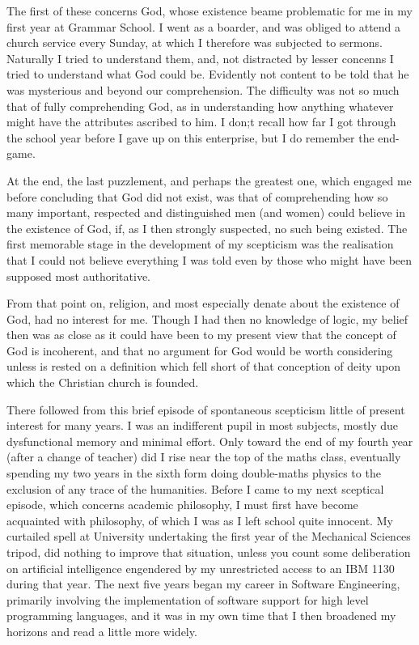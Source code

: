 \documentclass[10pt,titlepage]{book}
\begin{document}
The first of these concerns God, whose existence beame problematic for me in my first year at Grammar School.
I went as a boarder, and was obliged to attend a church service every Sunday, at which I therefore was subjected to sermons.
Naturally I tried to understand them, and, not distracted by lesser concenns I tried to understand what God could be.
Evidently not content to be told that he was mysterious and beyond our comprehension.
The difficulty was not so much that of fully comprehending God, as in understanding how anything whatever might have the attributes ascribed to him.
I don;t recall how far I got through the school year before I gave up on this enterprise, but I do remember the end-game.

At the end, the last puzzlement, and perhaps the greatest one, which engaged me before concluding that God did not exist, was that of comprehending how so many important, respected and distinguished men (and women) could believe in the existence of God, if, as I then strongly suspected, no such being existed.
The first memorable stage in the development of my scepticism was the realisation that I could not believe everything I was told even by those who might have been supposed most authoritative.

From that point on, religion, and most especially denate about the existence of God, had no interest for me.
Though I had then no knowledge of logic, my belief then was as close as it could have been to my present view that the concept of God is incoherent, and that no argument for God would be worth considering unless is rested on a definition which fell short of that conception of deity upon which the Christian church is founded.

There followed from this brief episode of spontaneous scepticism little of present interest for many years.
I was an indifferent pupil in most subjects, mostly due dysfunctional memory and minimal effort.
Only toward the end of my fourth year (after a change of teacher) did I rise near the top of the maths class, eventually spending my two years in the sixth form doing double-maths physics to the exclusion of any trace of the humanities.
Before I came to my next sceptical episode, which concerns academic philosophy, I must first have become acquainted with philosophy, of which I was as I left school quite innocent.
My curtailed spell at University undertaking the first year of the Mechanical Sciences tripod, did nothing to improve that situation, unless you count some deliberation on artificial intelligence engendered by my unrestricted access to an IBM 1130 during that year.
The next five years began my career in Software Engineering, primarily involving the implementation of software support for high level programming languages, and it was in my own time that I then broadened my horizons and read a little more widely.
\end{document}
